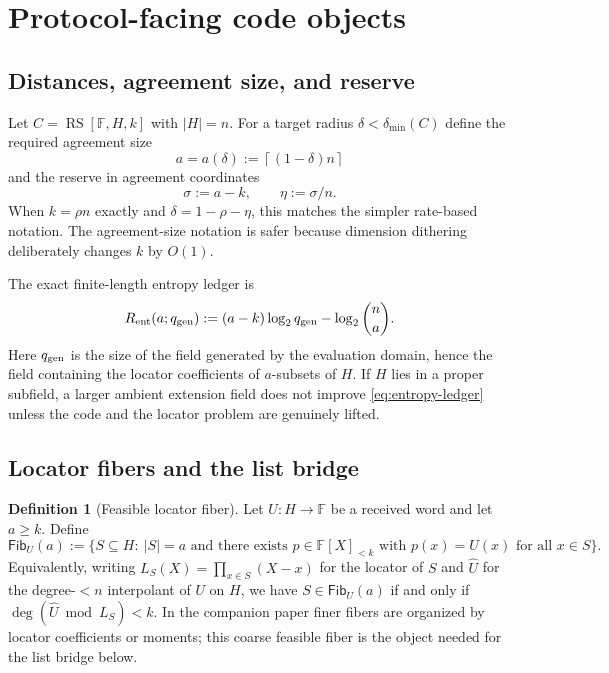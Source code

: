 \documentclass[11pt]{article}
\theoremstyle{definition}
\newtheorem{definition}[theorem]{Definition}
\newcommand{\F}{\mathbb F}
\newcommand{\RS}{\operatorname{RS}}
\newcommand{\qgen}{q_{\rm gen}}
\newcommand{\Fib}{\mathsf{Fib}}
\newcommand{\entres}{R_{\rm ent}}
\newcommand{\ceil}[1]{\left\lceil #1\right\rceil}
\begin{document}
\section{Protocol-facing code objects}
\label{sec:objects}

\subsection{Distances, agreement size, and reserve}

Let $C=\RS[\F,H,k]$ with $|H|=n$.  For a target radius $\delta<\delta_{\min}(C)$ define the required agreement size
\[
        a=a(\delta):=\ceil{(1-\delta)n}
\]
and the reserve in agreement coordinates
\[
        \sigma:=a-k,
        \qquad
        \eta:=\sigma/n .
\]
When $k=\rho n$ exactly and $\delta=1-\rho-\eta$, this matches the simpler rate-based notation.  The agreement-size notation is safer because dimension dithering deliberately changes $k$ by $O(1)$.

The exact finite-length entropy ledger is
\begin{equation}
\label{eq:entropy-ledger}
        \entres(a;\qgen)
        :=(a-k)\log_2\qgen-\log_2\binom n a .
\end{equation}
Here $\qgen$ is the size of the field generated by the evaluation domain, hence the field containing the locator coefficients of $a$-subsets of $H$.  If $H$ lies in a proper subfield, a larger ambient extension field does not improve \eqref{eq:entropy-ledger} unless the code and the locator problem are genuinely lifted.

\subsection{Locator fibers and the list bridge}
\label{sec:fibers}

\begin{definition}[Feasible locator fiber]
\label{def:fiber}
Let $U:H\to\F$ be a received word and let $a\ge k$.  Define
\[
        \Fib_U(a):=\bigl\{S\subseteq H:\
        |S|=a \text{ and there exists } p\in\F[X]_{<k}
        \text{ with } p(x)=U(x) \text{ for all } x\in S\bigr\}.
\]
Equivalently, writing $L_S(X)=\prod_{x\in S}(X-x)$ for the locator of $S$ and $\widehat U$ for the degree-$<n$ interpolant of $U$ on $H$, we have $S\in\Fib_U(a)$ if and only if $\deg(\widehat U\bmod L_S)<k$.  In the companion paper finer fibers are organized by locator coefficients or moments; this coarse feasible fiber is the object needed for the list bridge below.
\end{definition}
\end{document}
